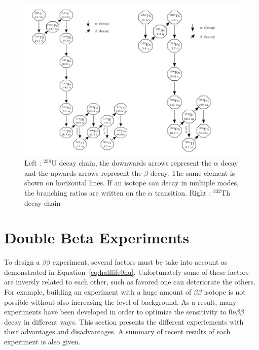 \documentclass[main.tex]{subfiles}
\begin{document}
\begin{figure}[h!]
\begin{center}
\includegraphics[scale=0.40]{pictures/Chap2/u238-th232decayChain.pdf}
\caption{Left : $^{238}$U decay chain, the downwards arrows represent the $\alpha$ decay and the upwards arrows represent the $\beta$ decay. The same element is shown on horizontal lines. If an isotope can decay in multiple modes, the branching ratios are written on the $\alpha$ transition. Right : $^{232}$Th decay chain }
\label{u238-th232decayChain}
\end{center}
\end{figure}


\FloatBarrier


\section{Double Beta Experiments}\label{sec:DBDexperiment}


\NI To design a $\beta\beta$ experiment, several factors must be take into account as demonstrated in Equation~\ref{eq:halflife0nu}. Unfortunately some of these factors are inversly related to each other, such as favored one can deteriorate the others. For example, building an experiment with a huge amount of $\beta\beta$ isotope is not possible without also increasing the level of background. As a result, many experiments have been developed in order to optimize the sensitivity to 0$\nu\beta\beta$ decay in different ways. This section presents the different experiements with their advantages and disadvantages. A summary of recent results of each experiment is also given.
\end{document}
